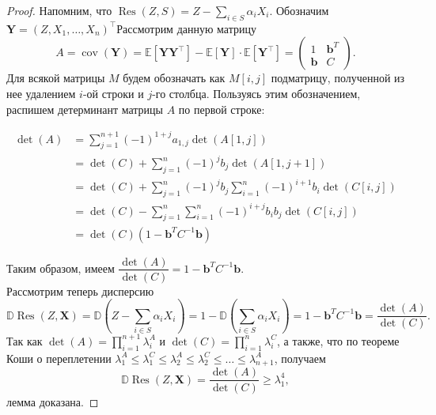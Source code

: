\documentclass[preprint,12pt]{elsarticle}
\begin{document}
\begin{proof}
Напомним, что 
$\operatorname{Res}(Z, S)=Z-\sum\limits_{i \in S} \alpha_{i} X_{i}$. Обозначим $\mathbf{Y}= (Z, X_1, \dots, X_n)^\top $Рассмотрим данную матрицу 
$$A=\operatorname{cov}(\mathbf{Y})=\mathbb{E}\left[\mathbf{Y Y}^{\top}\right]-\mathbb{E}[\mathbf{Y}] \cdot \mathbb{E}\left[\mathbf{Y}^{\top}\right]=\left(\begin{array}{ll}
1 & \mathbf{b}^{T} \\
\mathbf{b} & C
\end{array}\right).$$
Для всякой матрицы $M$ будем обозначать как $M[i,j]$ подматрицу, полученной из нее удалением $i$-ой строки и $j$-го столбца. Пользуясь этим обозначением, распишем детерминант матрицы $A$ по первой строке:

\begin{equation}\begin{aligned}
\operatorname{det}(A) &=\sum_{j=1}^{n+1}(-1)^{1+j} a_{1, j} \operatorname{det}(A[1, j]) \\
&=\operatorname{det}(C)+\sum_{j=1}^{n}(-1)^{j} b_{j} \operatorname{det}(A[1, j+1]) \\
&=\operatorname{det}(C)+\sum_{j=1}^{n}(-1)^{j} b_{j} \sum_{i=1}^{n}(-1)^{i+1} b_{i} \operatorname{det}(C[i, j]) \\
&=\operatorname{det}(C)-\sum_{j=1}^{n} \sum_{i=1}^{n}(-1)^{i+j} b_{i} b_{j} \operatorname{det}(C[i, j]) \\
&=\operatorname{det}(C)\left(1-\mathbf{b}^{T} C^{-1} \mathbf{b}\right)
\end{aligned}\end{equation}

Таким образом, имеем $\dfrac{\operatorname{det}(A)}{\operatorname{det}(C)}=1-\mathbf{b}^{T} C^{-1} \mathbf{b}$.\\

Рассмотрим теперь дисперсию 
\[\mathbb{D}\operatorname{Res}(Z, \mathbf{X})=\mathbb{D}(Z-\sum\limits_{i \in S} \alpha_{i} X_{i})=1-\mathbb{D}(\sum\limits_{i \in S} \alpha_{i} X_{i})= 1-\mathbf{b}^{T} C^{-1} \mathbf{b}=\dfrac{\operatorname{det}(A)}{\operatorname{det}(C)}.\]
Так как
$\operatorname{det}(A)=\prod_{i=1}^{n+1} \lambda_{i}^{A}$ и $\operatorname{det}(C)=\prod_{i=1}^{n} \lambda_{i}^{C}$, а также, что по теореме Коши о переплетении \cite{gowda2011cauchy} $\lambda_{1}^{A} \leq \lambda_{1}^{C} \leq \lambda_{2}^{A} \leq \lambda_{2}^{C} \leq \ldots \leq \lambda_{n+1}^{A}$, получаем 
\[\mathbb{D}\operatorname{Res}(Z, \mathbf{X})=\frac{\operatorname{det}(A)}{\operatorname{det}(C)} \geq \lambda_{1}^{4},\]
лемма доказана.
\end{proof}
\end{document}
